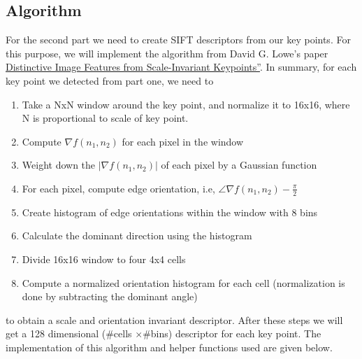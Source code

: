 \documentclass{article}
\begin{document}
\subsection{Algorithm}
For the second part we need to create SIFT descriptors from our key points. For this purpose, we will implement the algorithm from David G. Lowe's paper \href{``https://www.cs.ubc.ca/~lowe/papers/ijcv04.pdf}{Distinctive Image Features from Scale-Invariant Keypoints''}.
In summary, for each key point we detected from part one, we need to 
\begin{enumerate}
\item Take a NxN window around the key point, and normalize it to 16x16, where N is proportional to scale of key point.
\item Compute $ \nabla f(n_{1}, n_{2}) $ for each pixel in the window
\item Weight down the  $|\nabla f(n_{1}, n_{2})| $ of each pixel by a Gaussian function
\item For each pixel, compute edge orientation, i.e, $ \angle \nabla f(n_{1}, n_{2}) - \frac{\pi}{2}$ 
\item Create histogram of edge orientations within the window with 8 bins
\item Calculate the dominant direction using the histogram
\item Divide 16x16 window to four 4x4 cells
\item Compute a normalized orientation histogram for each cell (normalization is done by subtracting the dominant angle)
\end{enumerate}
to obtain a scale and orientation invariant descriptor. After these steps we will get a 128 dimensional (\#cells $\times $\#bins) descriptor for each key point. The implementation of this algorithm and helper functions used are given below.
\end{document}
